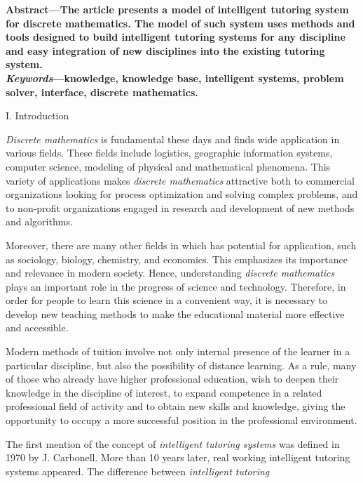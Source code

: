 \documentclass{article}
\begin{document}
\begin{multicols}
\normalsize
    \textbf{Abstract—The article presents a model of intelligent
tutoring system for discrete mathematics. The model of such
system uses methods and tools designed to build intelligent
tutoring systems for any discipline and easy integration of
new disciplines into the existing tutoring system.}\\
\indent
\textbf{\textit{Keywords}—knowledge, knowledge base, intelligent systems, problem solver, interface, discrete mathematics.}\\
\begin{center}
    I. Introduction
\end{center}

\textit{Discrete mathematics} is fundamental these days and
finds wide application in various fields. These fields
include logistics, geographic information systems, computer science, modeling of physical and mathematical
phenomena. This variety of applications makes \textit{discrete
mathematics} attractive both to commercial organizations
looking for process optimization and solving complex
problems, and to non-profit organizations engaged in research and development of new methods and algorithms.
\par 
Moreover, there are many other fields in which  has potential for application, such as sociology, biology, chemistry, and economics. This emphasizes
its importance and relevance in modern society. Hence,
understanding \textit{discrete mathematics} plays an important
role in the progress of science and technology. Therefore,
in order for people to learn this science in a convenient
way, it is necessary to develop new teaching methods
to make the educational material more effective and
accessible.
\par
Modern methods of tuition involve not only internal
presence of the learner in a particular discipline, but also
the possibility of distance learning. As a rule, many of
those who already have higher professional education,
wish to deepen their knowledge in the discipline of
interest, to expand competence in a related professional
field of activity and to obtain new skills and knowledge,
giving the opportunity to occupy a more successful
position in the professional environment.
\par
The first mention of the concept of \textit{intelligent tutoring
systems} was defined in 1970 by J. Carbonell. More than
10 years later, real working intelligent tutoring systems
appeared. The difference between \textit{intelligent tutoring
}
\end{multicols}
\end{document}
